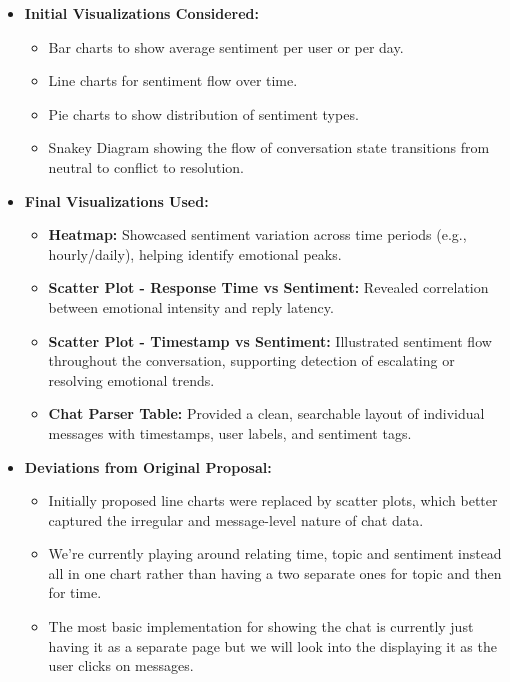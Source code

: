 \documentclass{article}\usepackage{graphicx}
\begin{document}
\begin{itemize}
    \item \textbf{Initial Visualizations Considered:}
    \begin{itemize}
        \item Bar charts to show average sentiment per user or per day.
        \item Line charts for sentiment flow over time.
        \item Pie charts to show distribution of sentiment types.
        \item Snakey Diagram showing the flow of conversation state transitions from neutral to conflict to resolution.
    \end{itemize}

    \item \textbf{Final Visualizations Used:}
    \begin{itemize}
        \item \textbf{Heatmap:} Showcased sentiment variation across time periods (e.g., hourly/daily), helping identify emotional peaks.
        \item \textbf{Scatter Plot - Response Time vs Sentiment:} Revealed correlation between emotional intensity and reply latency.
        \item \textbf{Scatter Plot - Timestamp vs Sentiment:} Illustrated sentiment flow throughout the conversation, supporting detection of escalating or resolving emotional trends.
        \item \textbf{Chat Parser Table:} Provided a clean, searchable layout of individual messages with timestamps, user labels, and sentiment tags.
    \end{itemize}    

    \item \textbf{Deviations from Original Proposal:}
    \begin{itemize}
        \item Initially proposed line charts were replaced by scatter plots, which better captured the irregular and message-level nature of chat data.
        \item We're currently playing around relating time, topic and sentiment instead all in one chart rather than having a two separate ones for topic and then for time.
        \item The most basic implementation for showing the chat is currently just having it as a separate page but we will look into the displaying it as the user clicks on messages. 
    \end{itemize}
\end{itemize}
\end{document}

